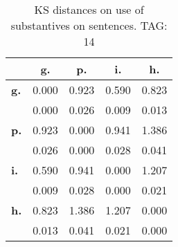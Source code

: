 \begin{table}[h!]
\begin{center}
\begin{tabular}{| l || c | c | c | c |}\hline
 & {\bf g.} & {\bf p.} & {\bf i.} & {\bf h.} \\\hline\hline
{\bf g.} & 0.000 & 0.923 & 0.590 & 0.823 \\
{\bf } & 0.000 & 0.026 & 0.009 & 0.013 \\\hline
{\bf p.} & 0.923 & 0.000 & 0.941 & 1.386 \\
{\bf } & 0.026 & 0.000 & 0.028 & 0.041 \\\hline
{\bf i.} & 0.590 & 0.941 & 0.000 & 1.207 \\
{\bf } & 0.009 & 0.028 & 0.000 & 0.021 \\\hline
{\bf h.} & 0.823 & 1.386 & 1.207 & 0.000 \\
{\bf } & 0.013 & 0.041 & 0.021 & 0.000 \\\hline
\end{tabular}
\caption{KS distances on use of substantives on sentences. TAG: 14}
\end{center}
\end{table}